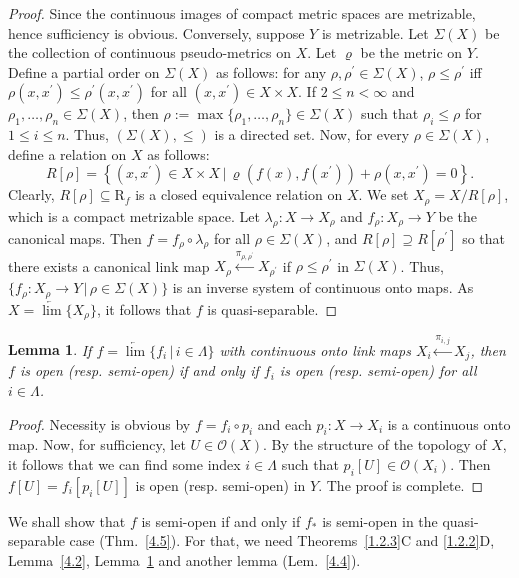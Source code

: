 \documentclass[12pt,final,3p,times]{elsarticle}
\newtheorem{lem}[thm]{Lemma}
\theoremstyle{definition}
\numberwithin{equation}{section}
\begin{document}
\begin{proof}
Since the continuous images of compact metric spaces are metrizable, hence sufficiency is obvious. Conversely, suppose $Y$ is metrizable. Let $\Sigma(X)$ be the collection of continuous pseudo-metrics on $X$. Let $\varrho$ be the metric on $Y$. Define a partial order on $\Sigma(X)$ as follows: for any $\rho,\rho^\prime\in\Sigma(X)$, $\rho\le\rho^\prime$ iff $\rho(x,x^\prime)\le\rho^\prime(x,x^\prime)$ for all $(x,x^\prime)\in X\times X$. If $2\le n<\infty$ and $\rho_1,\dotsc,\rho_n\in\Sigma(X)$, then $\rho:=\max\{\rho_1,\dotsc,\rho_n\}\in\Sigma(X)$ such that $\rho_i\le\rho$ for $1\le i\le n$. Thus, $(\Sigma(X),\le)$ is a directed set. Now, for every $\rho\in\Sigma(X)$, define a relation on $X$ as follows:
$$
R[\rho]=\left\{(x,x^\prime)\in X\times X\,|\,\varrho(f(x),f(x^\prime))+\rho(x,x^\prime)=0\right\}.
$$
Clearly, $R[\rho]\subseteq \textrm{R}_{f}$ is a closed equivalence relation on $X$. We set $X_\rho=X/R[\rho]$, which is a compact metrizable space. Let $\lambda_\rho\colon X\rightarrow X_\rho$ and $f_\rho\colon X_\rho\rightarrow Y$ be the canonical maps. Then $f=f_\rho\circ\lambda_\rho$ for all $\rho\in\Sigma(X)$, and $R[\rho]\supseteq R[\rho^\prime]$ so that there exists a canonical link map $X_\rho\xleftarrow{\pi_{\rho,\rho^\prime}}X_{\rho^\prime}$ if $\rho\le\rho^\prime$ in $\Sigma(X)$. Thus, $\{f_\rho\colon X_\rho\rightarrow Y\,|\,\rho\in\Sigma(X)\}$ is an inverse system of continuous onto maps.
As $X=\underleftarrow{\lim}\{X_\rho\}$, it follows that $f$ is quasi-separable.
\end{proof}

\begin{lem}\label{4.3}
If $f=\underleftarrow{\lim}\{f_i \,|\,i\in\Lambda\}$ with continuous onto link maps $X_i\xleftarrow{\pi_{i,j}}X_j$, then $f$ is open (resp. semi-open) if and only if $f_i$ is open (resp. semi-open) for all $i\in\Lambda$.
\end{lem}

\begin{proof}
Necessity is obvious by $f=f_i\circ p_i$ and each $p_i\colon X\rightarrow X_i$ is a continuous onto map. Now, for sufficiency, let $U\in\mathscr{O}(X)$. By the structure of the topology of $X$, it follows that we can find some index $i\in\Lambda$ such that $p_i[U]\in\mathscr{O}(X_i)$. Then $f[U]=f_i[p_i[U]]$ is open (resp. semi-open) in $Y$. The proof is complete.
\end{proof}

We shall show that $f$ is semi-open if and only if $f_*$ is semi-open in the quasi-separable case (Thm.~\ref{4.5}). For that, we need Theorems~\ref{1.2.3}C and \ref{1.2.2}D, Lemma~\ref{4.2}, Lemma~\ref{4.3} and another lemma (Lem.~\ref{4.4}).
\end{document}
